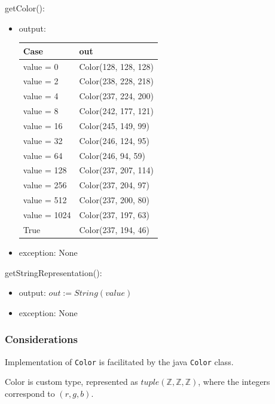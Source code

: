 \documentclass[12pt]{article}
\begin{document}
\noindent getColor():
\begin{itemize}
  \item output:

        \begin{tabular}{| p{3cm} | p{5cm} |}
          \hline
          Case         & out                  \\
          \hline
          value = 0    & Color(128, 128, 128) \\
          \hline
          value = 2    & Color(238, 228, 218) \\
          \hline
          value = 4    & Color(237, 224, 200) \\
          \hline
          value = 8    & Color(242, 177, 121) \\
          \hline
          value = 16   & Color(245, 149, 99)  \\
          \hline
          value = 32   & Color(246, 124, 95)  \\
          \hline
          value = 64   & Color(246, 94, 59)   \\
          \hline
          value = 128  & Color(237, 207, 114) \\
          \hline
          value = 256  & Color(237, 204, 97)  \\
          \hline
          value = 512  & Color(237, 200, 80)  \\
          \hline
          value = 1024 & Color(237, 197, 63)  \\
          \hline
          True         & Color(237, 194, 46)  \\
          \hline
        \end{tabular}
  \item exception: None
\end{itemize}

\noindent getStringRepresentation():
\begin{itemize}
  \item output: $out := String(value)$
  \item exception: None
\end{itemize}

\subsubsection{Considerations}

Implementation of \texttt{Color} is facilitated by the java \texttt{Color} class.

Color is custom type, represented as $tuple(\mathbb{Z}, \mathbb{Z}, \mathbb{Z})$, where the integers correspond to $(r, g, b)$.
\end{document}
